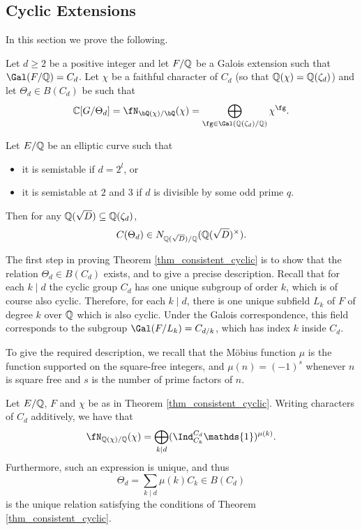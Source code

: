 \subsection{Cyclic Extensions}
In this section we prove the following. 
\begin{thm}\label{thm_consistent_cyclic}
    Let $d\geq2$ be a positive integer and let $F/\mathbb{Q}$ be a Galois extension such that $\Gal(F/\QQ)=C_d$. Let $\chi$ be a faithful character of $C_d$ (so that $\mathbb{Q}(\chi)=\mathbb{Q}(\zeta_d)$) and let $\Theta_d\in B(C_d)$ be such that
    $$\CC[G/\Theta_d]=\repnorm{\chi}=\bigoplus_{\fg\in\Gal(\QQ(\zeta_d)/\QQ)}\chi^{\fg}.$$

    Let $E/\mathbb{Q}$ be an elliptic curve such that
    \begin{itemize}
        \item it is semistable if $d=2^l$, or
        \item it is semistable at $2$ and $3$ if $d$ is divisible by some odd prime $q$.
    \end{itemize}

    Then for any $\mathbb{Q}(\sqrt{D})\subseteq\mathbb{Q}(\zeta_d)$,
    $$C(\Theta_d)\in N_{\mathbb{Q}(\sqrt{D})/\mathbb{Q}}(\mathbb{Q}(\sqrt{D})^{\times}).$$
\end{thm}

The first step in proving Theorem \ref{thm_consistent_cyclic} is to show that the relation $\Theta_d\in B(C_d)$ exists, and to give a precise description. Recall that for each $k\mid d$ the cyclic group $C_d$ has one unique subgroup of order $k$, which is of course also cyclic. Therefore, for each $k\mid d$, there is one unique subfield $L_k$ of $F$ of degree $k$ over $\mathbb{Q}$ which is also cyclic. Under the Galois correspondence, this field corresponds to the subgroup $\Gal(F/L_k)=C_{d/k}$, which has index $k$ inside $C_d$.

To give the required description, we recall that the Möbius function $\mu$ is the function supported on the square-free integers, and $\mu(n)=(-1)^s$ whenever $n$ is square free and $s$ is the number of prime factors of $n$.

\begin{lemma}\label{lem_cyclic_decomp}
    Let $E/\mathbb{Q}$, $F$ and $\chi$ be as in Theorem \ref{thm_consistent_cyclic}. Writing characters of $C_d$ additively, we have that
    \begin{equation}\label{eqn_cyclic_relation}
        \fN_{\QQ(\chi)/\QQ}(\chi)=\bigoplus_{k\mid d}(\Ind_{C_k}^{C_d}\mathds{1})^{\mu(k)}.
    \end{equation}
    Furthermore, such an expression is unique, and thus
    $$\Theta_d=\sum_{k\mid d}\mu(k)C_k\in B(C_d)$$
    is the unique relation satisfying the conditions of Theorem \ref{thm_consistent_cyclic}.
\end{lemma}



